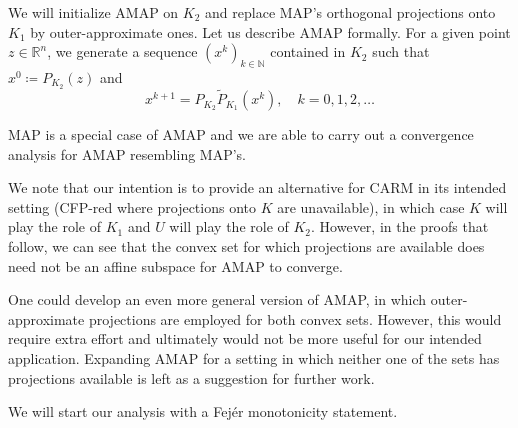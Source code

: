 \documentclass[smallextended,numbook,nospthms]{svjour3}
\theoremstyle{plain}
\theoremstyle{definition}
\def\RR{\mathds R}
\def\NN{\mathds N}
\begin{document}
We will initialize AMAP on $K_{2}$ and replace MAP's orthogonal projections onto $K_1$ by outer-approximate ones. Let us describe AMAP formally. For a given point $z \in \RR^{n}$, we generate a sequence $\left(x^{k}\right)_{k \in \NN}$ contained in $K_{2}$ such that $x^{0} \coloneqq P_{K_{2}}(z)$ and
$$
x^{k+1}=P_{K_{2}}\tilde{P}_{K_{1}}\left(x^{k}\right), \quad k=0,1,2, \ldots
$$

MAP is a special case of AMAP and we are able to carry out a convergence analysis for AMAP resembling MAP's. 

We note that our intention is to provide an alternative for CARM in its intended setting (CFP-red where projections onto $K$ are unavailable), in which case $K$ will play the role of $K_1$ and $U$ will play the role of $K_2$. However, in the proofs that follow, we can see that the convex set for which projections are available does need not be an affine subspace for AMAP to converge.

One could develop an even more general version of AMAP, in which outer-approximate projections are employed for both convex sets. However, this would require extra effort and ultimately would not be more useful for our intended application. Expanding AMAP for a setting in which neither one of the sets has projections available is left as a suggestion for further work.

We will start our analysis with a Fejér monotonicity statement.
\end{document}
